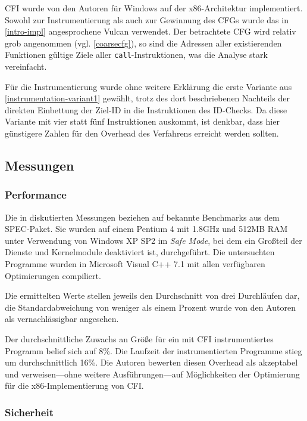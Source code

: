 \documentclass[11pt]{article}
\begin{document}
CFI wurde von den Autoren für Windows auf der x86-Architektur implementiert.
Sowohl zur Instrumentierung als auch zur Gewinnung des CFGs wurde das in
\ref{intro-impl} angesprochene Vulcan verwendet. Der betrachtete CFG wird
relativ grob angenommen (vgl. \ref{coarsecfg}), so sind die Adressen aller
existierenden Funktionen gültige Ziele aller \texttt{call}-Instruktionen, was
die Analyse stark vereinfacht.

Für die Instrumentierung wurde ohne weitere Erklärung die erste Variante aus
\ref{instrumentation-variant1} gewählt, trotz des dort beschriebenen Nachteils
der direkten Einbettung der Ziel-ID in die Instruktionen des ID-Checks. Da
diese Variante mit vier statt fünf Instruktionen auskommt, ist denkbar, dass
hier günstigere Zahlen für den Overhead des Verfahrens erreicht werden sollten.

\subsection{Messungen}

\subsubsection{Performance}
\label{cfi-performance}

Die in \cite{abadi-2009-control-tissec} diskutierten Messungen beziehen auf
bekannte Benchmarks aus dem SPEC-Paket. Sie wurden auf einem Pentium 4 mit
1.8GHz und 512MB RAM unter Verwendung von Windows XP SP2 im \emph{Safe Mode},
bei dem ein Großteil der Dienste und Kernelmodule deaktiviert ist,
durchgeführt. Die untersuchten Programme wurden in Microsoft Visual C++ 7.1 mit
allen verfügbaren Optimierungen compiliert.

Die ermittelten Werte stellen jeweils den Durchschnitt von drei Durchläufen
dar, die Standardabweichung von weniger als einem Prozent wurde von den Autoren
als vernachlässigbar angesehen.

Der durchschnittliche Zuwachs an Größe für ein mit CFI instrumentiertes
Programm belief sich auf 8\%. Die Laufzeit der instrumentierten Programme stieg
um durchschnittlich 16\%. Die Autoren bewerten diesen Overhead als akzeptabel
und verweisen—ohne weitere Ausführungen—auf Möglichkeiten der Optimierung für
die x86-Implementierung von CFI.

\subsubsection{Sicherheit}
\end{document}

